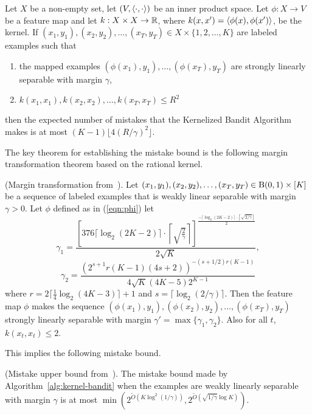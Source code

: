 \begin{theorem}
  Let $X$ be a non-empty set, let $(V,\langle \cdot,\cdot\rangle)$ be an
  inner product space.  Let $\phi:X\rightarrow V$ be a feature map and
  let $k:X\times X\rightarrow{\mathbb{R}}$, where
  $k(x,x')=\langle \phi(x),\phi(x')\rangle$, be the kernel.  If
  $(x_1,y_1),(x_2,y_2),\ldots,(x_T,y_T)\in X\times\{1,2,\ldots,K\}$
  are labeled examples such that
  \begin{enumerate}
  \item the mapped examples $(\phi(x_1),y_1),\ldots,(\phi(x_T),y_T)$
    are strongly linearly separable with margin $\gamma$,
  \item $k(x_1,x_1),k(x_2,x_2),\ldots,k(x_T,x_T)\leq R^2$
  \end{enumerate}
  then the expected number of mistakes that the {\sc Kernelized Bandit
    Algorithm} makes is at most $(K-1)\lfloor 4(R/\gamma)^2 \rfloor$.
  \label{thm:kernel-bandit-mistake-bound}
\end{theorem}

  The key theorem for establishing the mistake bound is the following
margin transformation theorem based on the rational kernel.

\begin{theorem}
  (Margin transformation from~\cite{BeygelzimerPSTWZ2019-separable}). Let
  $(x_1,y_1),(x_2,y_2),\ldots,(x_T,y_T)\in {\mathrm{B}}(0,1)\times [K]$ be a
  sequence of labeled examples that is weakly linear separable with
  margin $\gamma >0$.  Let $\phi$ defined as in (\ref{eqn:phi}) let
  \[
  \gamma_1 = \frac{
    \left[376\lceil\log_2(2K-2)\rceil\cdot\left\lceil\sqrt{\frac{2}{\gamma}}\right\rceil\right]^{
      \frac{-\lceil\log_2(2K-2)\rceil\cdot
      \left\lceil\sqrt{2/\gamma}\right\rceil}{2}}
  }{2\sqrt{K}},
  \]
  \[
  \gamma_2 =
  \frac{
    \left(2^{s+1}r(K-1)(4s+2)\right)^{-(s+1/2)r(K-1)}
  }{
    4\sqrt{K}(4K-5)2^{K-1}
  }
  \]
  where $r=2\lceil\frac{1}{4}\log_2(4K-3)\rceil+1$ and
  $s=\lceil\log_2(2/\gamma)\rceil$.  Then the feature map $\phi$ makes
  the sequence $(\phi (x_1),y_1),(\phi (x_2),y_2),\ldots,(\phi
  (x_T),y_T)$ strongly linearly separable with margin
  $\gamma'=\max\{\gamma_1,\gamma_2\}$.  Also for all $t$,
  $k(x_t,x_t)\leq 2$.
\end{theorem}

This implies the following mistake bound.
\begin{corollary}
    (Mistake upper bound
    from~\cite{BeygelzimerPSTWZ2019-separable}). The mistake bound made
    by Algorithm~\ref{alg:kernel-bandit} when the examples are weakly
    linearly separable with margin $\gamma$ is at most
    $\min(2^{\tilde{O}(K\log^2(1/\gamma))},2^{\tilde{O}(\sqrt{1/\gamma}\log
      K)})$.
  \end{corollary}
  
